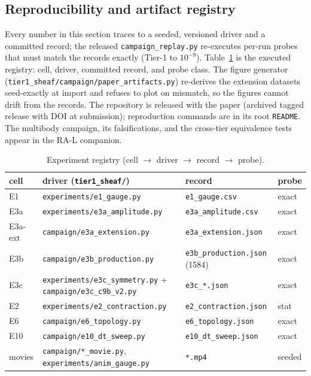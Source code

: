 \subsection{Reproducibility and artifact registry}
Every number in this section traces to a seeded, versioned driver and a
committed record; the released \texttt{campaign\_replay.py} re-executes
per-run probes that must match the records exactly (Tier-1 to $10^{-9}$).
Table~\ref{tab:registryF} is the executed registry: cell, driver, committed
record, and probe class. The figure generator
(\texttt{tier1\_sheaf/campaign/paper\_artifacts.py}) re-derives the
extension datasets seed-exactly at import and refuses to plot on mismatch,
so the figures cannot drift from the records. The repository is released
with the paper (archived tagged release with DOI at submission);
reproduction commands are in its root \texttt{README}. The multibody
campaign, its falsifications, and the cross-tier equivalence tests appear in
the RA-L companion.

\begin{table}[t]
\centering
\caption{Experiment registry (cell $\to$ driver $\to$ record $\to$ probe).}
\label{tab:registryF}
\begin{tabular}{llll}
\toprule
cell & driver (\texttt{tier1\_sheaf/}) & record & probe \\
\midrule
E1 & \texttt{experiments/e1\_gauge.py} & \texttt{e1\_gauge.csv} & exact \\
E3a & \texttt{experiments/e3a\_amplitude.py} & \texttt{e3a\_amplitude.csv} &
exact \\
E3a-ext & \texttt{campaign/e3a\_extension.py} & \texttt{e3a\_extension.json} &
exact \\
E3b & \texttt{campaign/e3b\_production.py} & \texttt{e3b\_production.json}
(1584) & exact \\
E3c & \texttt{experiments/e3c\_symmetry.py} + \texttt{campaign/e3c\_c9b\_v2.py}
& \texttt{e3c\_*.json} & exact \\
E2 & \texttt{experiments/e2\_contraction.py} & \texttt{e2\_contraction.json} &
stat \\
E6 & \texttt{campaign/e6\_topology.py} & \texttt{e6\_topology.json} & exact \\
E10 & \texttt{campaign/e10\_dt\_sweep.py} & \texttt{e10\_dt\_sweep.json} &
exact \\
movies & \texttt{campaign/*\_movie.py}, \texttt{experiments/anim\_gauge.py} &
\texttt{*.mp4} & seeded \\
\bottomrule
\end{tabular}
\end{table}
